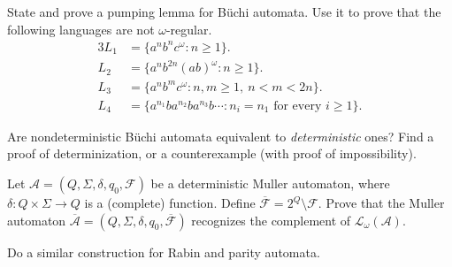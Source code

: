\documentclass[11pt,a4paper]{tutorial}
\newcommand{\Lang}{\mathcal{L}}
\let\L=\Lang
\def\hint#1{[\textit{Hint}: #1]}
\begin{document}
\begin{exercise}
State and prove a pumping lemma for Büchi automata.
%
%
Use it to prove that the following languages are not $\omega$-regular.
\begin{alignat*}{3}
L_1&=\{a^nb^nc^\omega:n\ge1\}.
\\
L_2&=\{a^nb^{2n}(ab)^\omega:n\ge1\}.
\\
L_3&=\{a^nb^mc^\omega:n,m\ge1,\ n<m<2n\}.
\\
L_4&= \{a^{n_1}ba^{n_2}ba^{n_3}b\cdots: n_i=n_1\text{ for every }i \geq 1\}.
\end{alignat*}
\end{exercise}

\begin{exercise}
Are nondeterministic Büchi automata
equivalent to \emph{deterministic} ones?
Find a proof of determinization, or a counterexample (with proof of impossibility).
\end{exercise}

\begin{exercise}
Let
\(
\mathcal A=(Q,\Sigma,\delta,q_0,\mathcal F)
\)
be a deterministic Muller automaton, 
where $\delta : Q \times \Sigma \to Q$ is a (complete) function.
Define
\(
\overline{\mathcal F}=2^Q\setminus\mathcal F.
\)
Prove that the Muller automaton
\(
\overline{\mathcal A}
=
(Q,\Sigma,\delta,q_0,\overline{\mathcal F})
\)
recognizes the complement of $\L_\omega(\mathcal A)$.

Do a similar construction for Rabin and parity automata.
\end{exercise}
\end{document}
